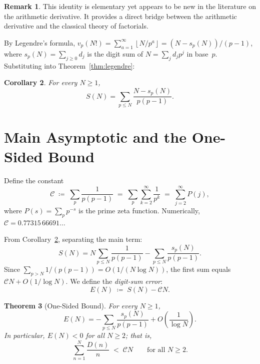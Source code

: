 \documentclass[11pt,a4paper]{amsart}
\theoremstyle{plain}
\newtheorem{theorem}{Theorem}[section]
\newtheorem{corollary}[theorem]{Corollary}
\theoremstyle{definition}
\newtheorem{remark}[theorem]{Remark}
\newcommand{\floor}[1]{\left\lfloor #1 \right\rfloor}
\begin{document}
\begin{remark}
This identity is elementary yet appears to be new in the literature on the 
arithmetic derivative.  It provides a direct bridge between the arithmetic 
derivative and the classical theory of factorials.
\end{remark}

By Legendre's formula, $v_p(N!) = \sum_{a=1}^{\infty} \floor{N/p^a} = (N - s_p(N))/(p-1)$, 
where $s_p(N) = \sum_{j \ge 0} d_j$ is the digit sum of $N = \sum_j d_j p^j$ in base~$p$.
Substituting into Theorem~\ref{thm:legendre}:

\begin{corollary}\label{cor:digitsum}
For every $N \ge 1$,
\begin{equation}\label{eq:digitsum}
S(N) = \sum_{p \le N} \frac{N - s_p(N)}{p(p-1)}.
\end{equation}
\end{corollary}

\section{Main Asymptotic and the One-Sided Bound}

Define the constant
\begin{equation}\label{eq:Cdef}
\mathcal{C} \;\coloneqq\; \sum_{p} \frac{1}{p(p-1)} 
\;=\; \sum_{p} \sum_{k=2}^{\infty} \frac{1}{p^k}
\;=\; \sum_{j=2}^{\infty} P(j),
\end{equation}
where $P(s) = \sum_p p^{-s}$ is the prime zeta function.  Numerically, 
$\mathcal{C} = 0.77315\,66691\ldots$

From Corollary~\ref{cor:digitsum}, separating the main term:
\begin{equation}\label{eq:decomp}
S(N) = N \sum_{p \le N} \frac{1}{p(p-1)} - \sum_{p \le N} \frac{s_p(N)}{p(p-1)}.
\end{equation}
Since $\sum_{p > N} 1/(p(p-1)) = O(1/(N \log N))$, the first sum equals 
$\mathcal{C} N + O(1/\log N)$.  We define the \emph{digit-sum error}:
\[
E(N) \;\coloneqq\; S(N) - \mathcal{C} N.
\]

\begin{theorem}[One-Sided Bound]\label{thm:onesided}
For every $N \ge 1$,
\begin{equation}\label{eq:exacterror}
E(N) = -\sum_{p \le N} \frac{s_p(N)}{p(p-1)} + O\!\left(\frac{1}{\log N}\right).
\end{equation}
In particular, $E(N) < 0$ for all $N \ge 2$; that is,
\begin{equation}\label{eq:onesided}
\sum_{n=1}^{N} \frac{D(n)}{n} \;<\; \mathcal{C} N \qquad \text{for all } N \ge 2.
\end{equation}
\end{theorem}
\end{document}
